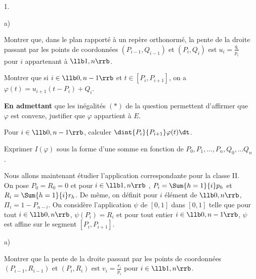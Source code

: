 \documentclass[11pt]{article}%
\begin{document}
\begin{noliste}{1.}
\begin{noliste}{a)}
  

  
  \item Montrer que, dans le plan rapporté à un repère orthonormé, la 
  pente de la droite passant par les points de coordonnées $(P_{i-1}, 
  Q_{i-1})$ et $(P_i, Q_i)$ est $u_i=\frac{q_i}{p_i}$ pour $i$ 
  appartenant à $\llb 1,n \rrb$. 
  
  
  
  
  
  

  
  \item Montrer que si $i \in \llb 0,n-1 \rrb$ et $t \in [P_i, 
  P_{i+1}]$, on a $\varphi(t) =u_{i+1} (t-P_i)+Q_i$. 
  
  
  
  \item \textbf{En admettant} que les inégalités $(\ast)$ de la 
  question  permettent d'affirmer que $\varphi$ est 
  convexe, justifier que $\varphi$ appartient à $E$. 
  
  

  
  \item Pour $i \in \llb 0,n-1 \rrb$, calculer $\dint{P_i}{P_{i+1}} 
  \varphi(t) \dt$. 
  
  
  
  \item Exprimer $I(\varphi)$ sous la forme d'une somme en fonction de 
  $P_0, P_1,...,P_n, Q_0,...Q_n$. 
  
  
 \end{noliste}
 
 \item Nous allons maintenant étudier l'application correspondante pour 
 la classe II.\\
 On pose $P_0=R_0=0$ et pour $i \in \llb 1,n \rrb$ , $P_i = 
 \Sum{h=1}{i} p_h$ et $R_i=\Sum{h=1}{i} r_h$. De même, on définit pour 
 $i$ élément de $\llb 0,n \rrb$, $\Pi_i=1-P_{n-i}$. On considère 
 l'application $\psi$ de $[0,1]$ dans $[0,1]$ telle que pour tout $i 
 \in \llb 0,n \rrb$, $\psi(P_i)=R_i$ et pour tout entier $i \in \llb 0, 
 n-1 \rrb$, $\psi$ est affine sur le segment $[P_i, P_{i+1}]$. 
 \begin{noliste}{a)}
  \setlength{\itemsep}{2mm}
  \item Montrer que la pente de la droite passant par les points de 
  coordonnées $(P_{i-1}, R_{i-1})$ et $(P_i, R_i)$ est $v_i 
  = \frac{r_i}{p_i}$ pour $i \in \llb 1,n \rrb$. 
  
  
  

\end{noliste}
\end{noliste}
\end{document}
